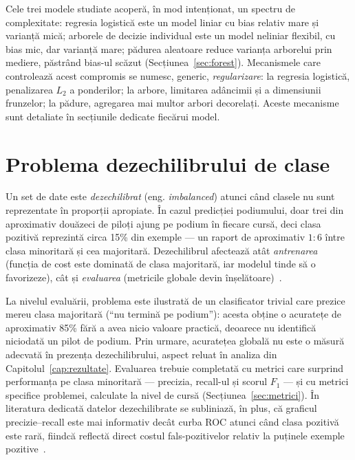 \documentclass[12pt,a4paper]{report}
\begin{document}
Cele trei modele studiate acoperă, în mod intenționat, un spectru de complexitate: regresia
logistică este un model liniar cu bias relativ mare și varianță mică; arborele de decizie
individual este un model neliniar flexibil, cu bias mic, dar varianță mare; pădurea aleatoare
reduce varianța arborelui prin mediere, păstrând bias-ul scăzut (Secțiunea~\ref{sec:forest}).
Mecanismele care controlează acest compromis se numesc, generic, \emph{regularizare}: la
regresia logistică, penalizarea $L_2$ a ponderilor; la arbore, limitarea adâncimii și a
dimensiunii frunzelor; la pădure, agregarea mai multor arbori decorelați. Aceste mecanisme sunt
detaliate în secțiunile dedicate fiecărui model.

\section{Problema dezechilibrului de clase}
\label{sec:dezechilibru}

Un set de date este \emph{dezechilibrat} (eng. \emph{imbalanced}) atunci când clasele nu sunt
reprezentate în proporții apropiate. În cazul predicției podiumului, doar trei din aproximativ
douăzeci de piloți ajung pe podium în fiecare cursă, deci clasa pozitivă reprezintă circa 15\%
din exemple --- un raport de aproximativ $1{:}6$ între clasa minoritară și cea majoritară.
Dezechilibrul afectează atât \emph{antrenarea} (funcția de cost este dominată de clasa
majoritară, iar modelul tinde să o favorizeze), cât și \emph{evaluarea} (metricile globale devin
înșelătoare)~\cite{he2009learning}.

La nivelul evaluării, problema este ilustrată de un clasificator trivial care prezice mereu clasa
majoritară (``nu termină pe podium''): acesta obține o acuratețe de aproximativ 85\% fără a avea
nicio valoare practică, deoarece nu identifică niciodată un pilot de podium. Prin urmare,
acuratețea globală nu este o măsură adecvată în prezența dezechilibrului, aspect reluat în
analiza din Capitolul~\ref{cap:rezultate}. Evaluarea trebuie completată cu metrici care surprind
performanța pe clasa minoritară --- precizia, recall-ul și scorul $F_1$ --- și cu metrici
specifice problemei, calculate la nivel de cursă (Secțiunea~\ref{sec:metrici}). În literatura
dedicată datelor dezechilibrate se subliniază, în plus, că graficul precizie--recall este mai
informativ decât curba ROC atunci când clasa pozitivă este rară, fiindcă reflectă direct costul
fals-pozitivelor relativ la puținele exemple pozitive~\cite{saito2015precision, fawcett2006roc}.
\end{document}
